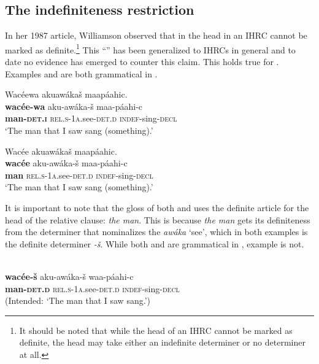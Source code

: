 \documentclass[output=paper]{LSP/langsci}
\begin{document}
\subsection{The {indefiniteness restriction}}\label{sec:boyle:4.1}

In her 1987 article, Williamson observed that in  the head in an IHRC cannot be marked as definite.\footnote{It should be noted that while the head of an IHRC cannot be marked as definite, the head may take either an indefinite determiner or no determiner at all.} This ``'' has been generalized to IHRCs in general and to date no evidence has emerged to counter this claim. This  holds true for .  Examples  and  are both grammatical in .

\ea  \label{boyle13}
\glll Wacéewa akuawáka\v{s} maapáahic.\\
\textbf{wacée-wa}     aku-awáka-\v{s}       maa-páahi-c\\
\textbf{man-\textsc{det.i}} \textsc{rel.s-1a}.see-\textsc{det.d} \textsc{indef}-sing-\textsc{decl}\\ 
\trans `The man that I saw sang (something).' 
\z

\ea \label{boyle14}
\glll Wacée akuawáka\v{s} maapáahic.\\
\textbf{wacée}  aku-awáka-\v{s} maa-páahi-c\\
\textbf{man} \textsc{rel.s-1a}.see-\textsc{det.d} \textsc{indef}-sing-\textsc{decl}\\
\trans `The man that I saw sang (something).' 
\z

It is important to note that the  gloss of both  and  uses the definite article for the head of the relative clause: \textit{the man}. This is because \textit{the man} gets its definiteness from the determiner that nominalizes the  \textit{awáka} `see', which in both examples is the definite determiner \textit{-\v{s}}. While both  and  are grammatical in , example  is not.

\ea \label{boyle15}
\\
\textbf{wacée-\v{s}}    aku-awáka-\v{s}   waa-páahi-c\\
\textbf{man-\textsc{det.d}} \textsc{rel.s-1a}.see-\textsc{det.d} \textsc{indef}-sing-\textsc{decl}\\
\trans (Intended: `The man that I saw sang.') 
\z
\end{document}
